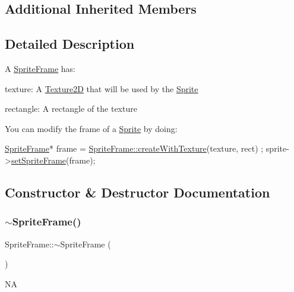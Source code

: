 \subsection*{Additional Inherited Members}


\subsection{Detailed Description}
A \hyperlink{classSpriteFrame}{Sprite\+Frame} has\+: 


\begin{DoxyItemize}
\item texture\+: A \hyperlink{classTexture2D}{Texture2D} that will be used by the \hyperlink{classSprite}{Sprite}
\item rectangle\+: A rectangle of the texture
\end{DoxyItemize}

You can modify the frame of a \hyperlink{classSprite}{Sprite} by doing\+:


\begin{DoxyCode}
\hyperlink{classSpriteFrame}{SpriteFrame}* frame = \hyperlink{classSpriteFrame_aff4175beed9c4b33737a0cad53d6884e}{SpriteFrame::createWithTexture}(texture, rect)
      ;
sprite->\hyperlink{classSprite_a858e1904c720bdea7cb6a6ad512f1195}{setSpriteFrame}(frame);
\end{DoxyCode}
 

\subsection{Constructor \& Destructor Documentation}
\mbox{\label{classSpriteFrame_a1d8c776029a8731967ab5a7e206f8954}} 
\subsubsection{\texorpdfstring{$\sim$\+Sprite\+Frame()}{~SpriteFrame()}\hspace{0.1cm}{\footnotesize\ttfamily [1/2]}}
{\footnotesize\ttfamily Sprite\+Frame\+::$\sim$\+Sprite\+Frame (\begin{DoxyParamCaption}{ }\end{DoxyParamCaption})\hspace{0.3cm}{\ttfamily [virtual]}}

NA \mbox{\label{classSpriteFrame_a871d849613f969d6b3abe62095167531}} 
